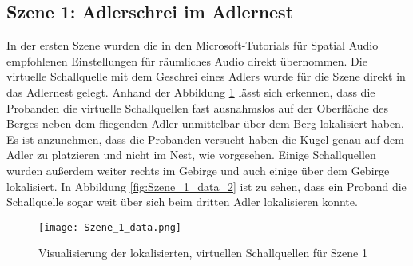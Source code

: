  \subsection{Szene 1: Adlerschrei im Adlernest}
 In der ersten Szene wurden die in den Microsoft-Tutorials für Spatial Audio empfohlenen Einstellungen für räumliches Audio direkt übernommen. Die virtuelle Schallquelle mit dem Geschrei eines Adlers wurde für die Szene direkt in das Adlernest gelegt. Anhand der Abbildung \ref{fig:Szene_1_data} lässt sich erkennen, dass die Probanden die virtuelle Schallquellen fast ausnahmslos auf der Oberfläche des Berges neben dem fliegenden Adler unmittelbar über dem Berg lokalisiert haben. Es ist anzunehmen, dass die Probanden versucht haben die Kugel genau auf dem Adler zu platzieren und nicht im Nest, wie vorgesehen. Einige Schallquellen wurden außerdem weiter rechts im Gebirge und auch einige über dem Gebirge lokalisiert. In Abbildung \ref{fig:Szene_1_data_2} ist zu sehen, dass ein Proband die Schallquelle sogar weit über sich beim dritten Adler lokalisieren konnte. 
 
   \begin{figure}[H]
\centering
\texttt{[image: Szene\_1\_data.png]}
\caption{Visualisierung der lokalisierten, virtuellen Schallquellen für Szene 1}
\label{fig:Szene_1_data}
\end{figure} 

